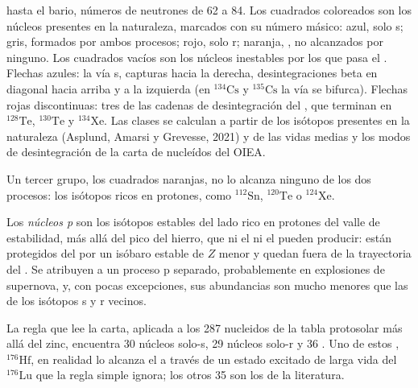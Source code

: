 \begin{omfigure}
{hasta el bario, números de neutrones de 62 a 84. Los cuadrados coloreados son los núcleos presentes en la naturaleza, marcados
con su número másico: azul, solo s; gris, formados por ambos procesos; rojo,
solo r; naranja, , no alcanzados por ninguno. Los cuadrados vacíos son los
núcleos inestables por los que pasa el . Flechas azules: la vía s,
capturas hacia la derecha, desintegraciones beta en diagonal hacia arriba y a la izquierda (en
$^{134}\mathrm{Cs}$ y $^{135}\mathrm{Cs}$ la vía se bifurca). Flechas rojas discontinuas:
tres de las cadenas de desintegración del , que terminan en
$^{128}\mathrm{Te}$, $^{130}\mathrm{Te}$ y $^{134}\mathrm{Xe}$. Las
clases se calculan a partir de los isótopos presentes en la naturaleza (Asplund,
Amarsi y Grevesse, 2021) y de las vidas medias y los modos de desintegración de la
carta de nucleídos del OIEA.}\label{fig:b3:origin-of-elements:chart}
\end{omfigure}

Un tercer grupo, los cuadrados naranjas, no lo alcanza ninguno de los dos procesos: los
isótopos ricos en protones, como $^{112}\mathrm{Sn}$, $^{120}\mathrm{Te}$
o $^{124}\mathrm{Xe}$.

\begin{definition}[núcleos p]\label{def:b3:origin-of-elements:p-process}
Los \emph{núcleos p} son los isótopos estables del lado
rico en protones del valle de estabilidad, más allá del pico del hierro, que ni el
 ni el  pueden producir: están protegidos del  por
un isóbaro estable de $Z$ menor y quedan fuera de la trayectoria del . Se
atribuyen a un proceso p separado, probablemente en explosiones de supernova, y, con
pocas excepciones, sus abundancias son mucho menores que las de los isótopos s y r
vecinos.
\end{definition}

La regla que lee la carta, aplicada a los 287 nucleidos de la
tabla protosolar más allá del zinc, encuentra 30 núcleos solo-s, 29 núcleos solo-r
y 36 . Uno de estos , $^{176}\mathrm{Hf}$, en realidad
lo alcanza el  a través de un estado excitado de larga vida del
$^{176}\mathrm{Lu}$ que la regla simple ignora; los otros 35 son los 
de la literatura.

